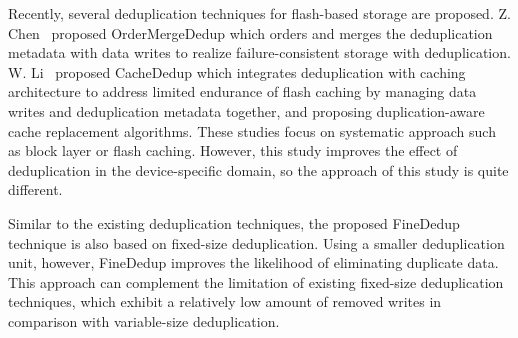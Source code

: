 Recently, several deduplication techniques for flash-based storage are proposed. Z. Chen~\cite{order-merge}
proposed OrderMergeDedup which orders and merges the deduplication metadata with data writes to 
realize failure-consistent storage with deduplication.  
W. Li~\cite{cachededup} proposed CacheDedup which integrates deduplication with caching architecture to 
address limited endurance of flash caching by managing data writes and deduplication metadata together, 
and proposing duplication-aware cache replacement algorithms. 
These studies focus on systematic approach such as block layer or flash caching. 
However, this study improves the effect of deduplication in the device-specific domain, 
so the approach of this study is quite different.

Similar to the existing deduplication techniques,
the proposed FineDedup technique is also based on fixed-size deduplication.
Using a smaller deduplication unit,
however, FineDedup improves the likelihood of eliminating duplicate data.
This approach can complement the limitation of existing fixed-size deduplication techniques,
which exhibit a relatively low amount of removed writes 
in comparison with variable-size deduplication.



